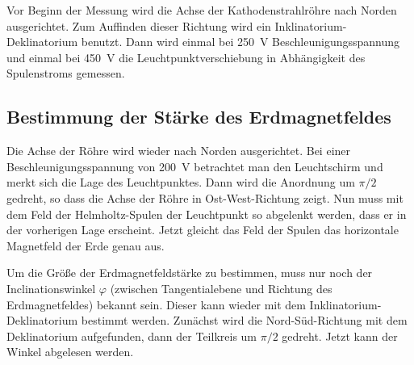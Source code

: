 Vor Beginn der Messung wird die Achse der Kathodenstrahlröhre nach
Norden ausgerichtet. Zum Auffinden dieser Richtung wird ein
Inklinatorium-Deklinatorium benutzt. Dann wird einmal bei
\SI{250}{\volt} Beschleunigungsspannung und einmal bei \SI{450}{\volt}
die Leuchtpunktverschiebung in Abhängigkeit des Spulenstroms gemessen.

\subsection{Bestimmung der Stärke des Erdmagnetfeldes}

Die Achse der Röhre wird wieder nach Norden ausgerichtet. Bei einer
Beschleunigungsspannung von \SI{200}{\volt} betrachtet man den
Leuchtschirm und merkt sich die Lage des Leuchtpunktes. Dann wird die
Anordnung um $\pi/2$ gedreht, so dass die Achse der Röhre in
Ost-West-Richtung zeigt. Nun muss mit dem Feld der
Helmholtz-Spulen der Leuchtpunkt so abgelenkt werden, dass er in
der vorherigen Lage erscheint. Jetzt gleicht das Feld der Spulen das
horizontale Magnetfeld der Erde genau aus.

Um die Größe der Erdmagnetfeldstärke zu bestimmen, muss nur noch der
Inclinationswinkel $\varphi$ (zwischen Tangentialebene und Richtung des
Erdmagnetfeldes) bekannt sein. Dieser kann wieder mit dem
Inklinatorium-Deklinatorium bestimmt werden. Zunächst wird die
Nord-Süd-Richtung mit dem Deklinatorium aufgefunden, dann der Teilkreis
um $\pi/2$ gedreht. Jetzt kann der Winkel abgelesen werden.
